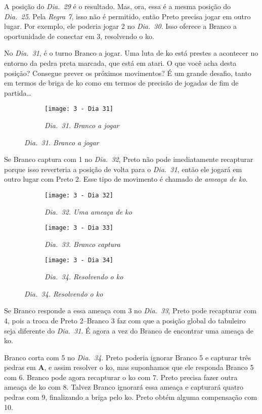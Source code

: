 A posição do \emph{Dia.\@~29} é o resultado. Mas, ora, essa é a mesma posição do \emph{Dia.\@~25}. Pela \emph{Regra 7}, isso não é permitido, então Preto precisa jogar em outro lugar. Por exemplo, ele poderia jogar 2 no \emph{Dia.\@~30}. Isso oferece a Branco a oportunidade de conectar em 3, resolvendo o ko.

No \emph{Dia.\@~31}, é o turno Branco a jogar. Uma luta de ko está prestes a acontecer no entorno da pedra preta marcada, que está em atari. O que você acha desta posição? Consegue prever os próximos movimentos? É um grande desafio, tanto em termos de briga de ko como em termos de precisão de jogadas de fim de partida\ldots

\begin{figure}[h]
    \centering
    \begin{subfigure}[t]{.3\textwidth}
        \centering
        \texttt{[image: 3 - Dia 31]}
        \caption*{\emph{Dia.\@~31. Branco a jogar}}
    \end{subfigure}
\end{figure}

\pagebreak

Se Branco captura com 1 no \emph{Dia.\@~32}, Preto não pode imediatamente recapturar porque isso reverteria a posição de volta para o \emph{Dia.\@~31}, então ele jogará em outro lugar com Preto 2. Esse tipo de movimento é chamado de \emph{ameaça de ko}.

\begin{figure}[h]
  \centering
  \begin{subfigure}[t]{.3\textwidth}
      \centering
      \texttt{[image: 3 - Dia 32]}
      \caption*{\emph{Dia.\@~32. Uma ameaça de ko}}
  \end{subfigure}
  \hfill
  \begin{subfigure}[t]{.3\textwidth}
      \centering
      \texttt{[image: 3 - Dia 33]}
      \caption*{\emph{Dia.\@~33. Branco captura}}
  \end{subfigure}
  \hfill
  \begin{subfigure}[t]{.3\textwidth}
      \centering
      \texttt{[image: 3 - Dia 34]}
      \caption*{\emph{Dia.\@~34. Resolvendo o ko}}
  \end{subfigure}
\end{figure}

Se Branco responde a essa ameaça com 3 no \emph{Dia.\@~33}, Preto pode recapturar com 4, pois a troca de Preto 2--Branco 3 faz com que a posição global do tabuleiro seja diferente do \emph{Dia.\@~31}. É agora a vez do Branco de encontrar uma ameaça de ko.

Branco corta com 5 no \emph{Dia.\@~34}. Preto poderia ignorar Branco 5 e capturar três pedras em \textbf{A}, e assim  resolver o ko, mas suponhamos que ele responda Branco 5 com 6. Branco pode agora recapturar o ko com 7. Preto precisa fazer outra ameaça de ko com 8. Talvez Branco ignorará essa ameaça e capturará quatro pedras com 9, finalizando a briga pelo ko. Preto obtém alguma compensação com 10.